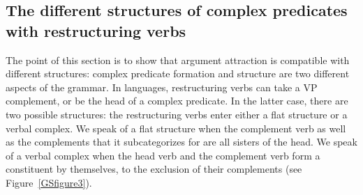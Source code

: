 \subsection{The different structures of complex predicates with restructuring verbs} \label{GSsection3.2}

The point of this section is to show that argument attraction is compatible with different structures: complex predicate formation and structure are two different aspects of the grammar. In  languages, restructuring verbs can take a VP complement, or be the head of a complex predicate. In the latter case, there are two possible structures: the restructuring verbs enter either a flat structure or a verbal complex. We speak of a flat structure when the complement verb as well as the complements that it subcategorizes for are all sisters of the head. We speak of a verbal complex when the head verb and the complement verb form a constituent by themselves, to the exclusion of their complements (see Figure~\ref{GSfigure3}).


